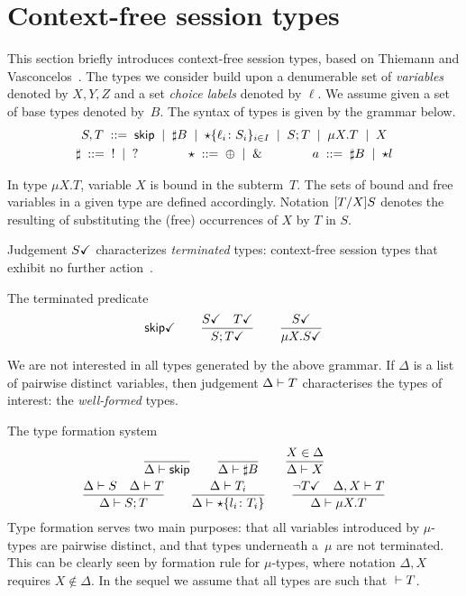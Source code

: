 \section{Context-free session types}
\label{sec:contextfreesession}

This section briefly introduces context-free session types, based on
Thiemann and Vasconcelos~\cite{thiemann2016context}.
%
The types we consider build upon a denumerable set of \emph{variables}
denoted by $X,Y,Z$ and a set \emph{choice labels} denoted by
$\ell$. We assume given a set of base types denoted by~$B$.
The syntax of types is given by the grammar below.
%
\begin{gather*}
  S,T \grmeq \skipk \grmor \sharp B \grmor 
  \star\{\ell_i\colon S_i\}_{i\in I} \grmor S;T \grmor \mu X.T \grmor X
  \\
  \sharp \grmeq {}! \grmor {}? 
  \qquad \qquad
  \star  \grmeq \oplus \grmor {}\&
  \qquad \qquad
  a \grmeq \sharp B \grmor \star l %
\end{gather*}

In type $\mu X.T$, variable $X$ is bound in the subterm~$T$. The sets
of bound and free variables in a given type are defined
accordingly. Notation $\subs{T}{X}S$ denotes the resulting of
substituting the (free) occurrences of $X$ by $T$ in $S$.

Judgement $\DONE S$ characterizes \emph{terminated} types:
context-free session types that exhibit no further
action~\cite{DBLP:journals/jacm/AcetoH92}.

\noindent The terminated predicate\hfill{} 
%
\begin{gather*}
  \DONE{\skipk}
  \qquad
  \frac{\DONE{S} \quad \DONE{T}}{\DONE{S; T}}
  \qquad
  \frac{\DONE S}{\DONE{\mu X.S}}
\end{gather*}

We are not interested in all types generated by the above grammar.
%
If $\Delta$ is a list of pairwise distinct variables, then judgement
$\isType T$ characterises the types of interest: the
\emph{well-formed} types.

\noindent The type formation system \hfill{}
%
\begin{gather*}
  \frac{} 
  {
    \isType \skipk
  }
  \qquad
  \frac{}
  {
    \isType {\sharp B}
  }
  \qquad
  \frac{
    X \in \Delta
  }{
    \isType{X}
  }
  \\
  \frac{
    \isType{S}
    \quad
    \isType{T}
  }{
    \isType{S;T}
  }
  \qquad
  \frac{
    \isType{T_i}
  }{
    \isType{\star 
      \{ l_i \colon T_i\}}
  }
  \qquad
  \frac{
    \neg\DONE T
    \quad 
    \isType [\Delta, X] T
  }{
    \isType {\mu X. T}
  }
\end{gather*}
%
Type formation serves two main purposes: that all variables introduced
by $\mu$-types are pairwise distinct, and that types underneath
a~$\mu$ are not terminated. This can be clearly seen by formation rule
for $\mu$-types, where notation $\Delta,X$ requires $X\notin\Delta$.
%
In the sequel we assume that all types are such that $\isType[] T$.

